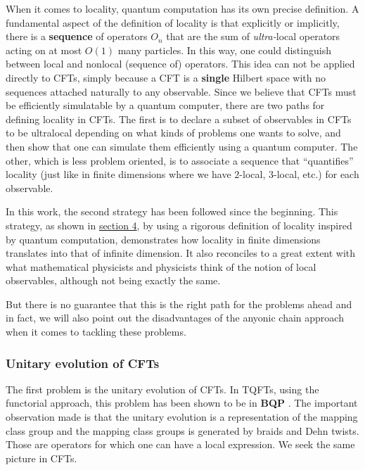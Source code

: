 \documentclass[twoside,11pt,titlepage]{amsart}
\renewcommand{\=}[1]{\stackrel{#1}{=}} %
\theoremstyle{definition}
\theoremstyle{remark}
\begin{document}
When it comes to locality, quantum computation has its own precise definition. A fundamental aspect of the definition of locality is that explicitly or implicitly, there is a \textbf{sequence} of operators $O_n$ that are the sum of \textit{ultra-}local operators acting on at most $O(1)$ many particles. In this way, one could distinguish between local and nonlocal (sequence of) operators. This idea can not be applied directly to CFTs, simply because a CFT is a \textbf{single} Hilbert space with no sequences attached naturally to any observable. Since we believe that CFTs must be efficiently simulatable by a quantum computer, there are two paths for defining locality in CFTs. The first is to declare a subset of observables in CFTs to be ultralocal depending on what kinds of problems one wants to solve, and then show that one can simulate them efficiently using a quantum computer. The other, which is less problem oriented, is to associate a sequence that ``quantifies'' locality (just like in finite dimensions where we have $2$-local, $3$-local, etc.) for each observable.

In this work, the second strategy has been followed since the beginning. This strategy, as shown in \hyperref[4]{section 4}, by using a rigorous definition of locality inspired by quantum computation, demonstrates how locality in finite dimensions translates into that of infinite dimension. It also reconciles to a great extent with what mathematical physicists and physicists think of the notion of local observables, although not being exactly the same.

But there is no guarantee that this is the right path for the problems ahead and in fact, we will also point out the disadvantages of the anyonic chain approach when it comes to tackling these problems.


\subsubsection{Unitary evolution of CFTs}

\hfill \break
The first problem is the unitary evolution of CFTs. In TQFTs, using the functorial approach, this problem has been shown to be in \textbf{BQP} \cite{simulation02}. The important observation made is that the unitary evolution is a representation of the mapping class group and the mapping class groups is generated by braids and Dehn twists. Those are operators for which one can have a local expression. We seek the same picture in CFTs.
\end{document}
